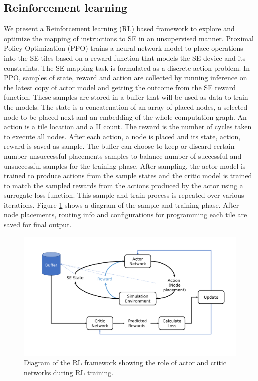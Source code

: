 \subsection{Reinforcement learning}

We present a Reinforcement learning (RL) based framework to explore and optimize the mapping of instructions to SE in an unsupervised 
manner. 
Proximal Policy Optimization (PPO) trains a neural network model to place operations into the SE tiles based on a reward 
function that models the SE device and its constraints. 
The SE mapping task is formulated as a discrete action problem. 
In PPO, samples of state, reward and action are collected by running inference on the latest copy of actor model and getting the outcome from the SE reward function. 
These samples are stored in a buffer that will be used as data to train the models. 
The state is a concatenation of an array of placed nodes, a selected node to be placed next and an embedding of the whole computation graph. 
An action is a tile location and a II count. 
The reward is the number of cycles taken to execute all nodes. 
After each action, a node is placed and its state, action, reward is saved as sample. 
The buffer can choose to keep or discard certain number unsuccessful placements samples to balance number of successful and unsuccessful samples for the training phase. 
After sampling, the actor model is trained to produce actions from the sample states and the critic model is trained to match the sampled rewards from the actions produced by the actor using a surrogate loss function. 
This sample and train process is repeated over various iterations. 
Figure \ref{fig:ppo} shows a diagram of the sample and training phase. 
After node placements, routing info and configurations for programming each tile are saved for final output.

\begin{figure}[h]
  \centering
  \includegraphics[width=\linewidth]{fig/ppo.pdf}
  \caption{Diagram of the RL framework showing the role of actor and critic networks during RL training. }
  \label{fig:ppo}
\end{figure}

